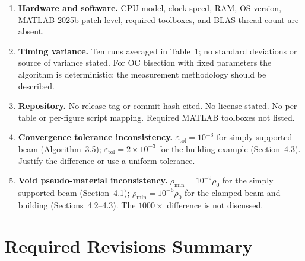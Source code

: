 \documentclass[11pt,a4paper]{article}
\begin{document}
\begin{enumerate}[label=\textbf{R\arabic*.},nosep]

\item \textbf{Hardware and software.} CPU model, clock speed, RAM, OS version,
  MATLAB 2025b patch level, required toolboxes, and BLAS thread count are absent.

\item \textbf{Timing variance.} Ten runs averaged in Table~1; no standard deviations
  or source of variance stated. For OC bisection with fixed parameters the algorithm
  is deterministic; the measurement methodology should be described.

\item \textbf{Repository.} No release tag or commit hash cited. No license stated.
  No per-table or per-figure script mapping. Required MATLAB toolboxes not listed.

\item \textbf{Convergence tolerance inconsistency.} $\varepsilon_\mathrm{tol}=10^{-3}$
  for simply supported beam (Algorithm~3.5); $\varepsilon_\mathrm{tol}=2\times10^{-3}$
  for the building example (Section~4.3). Justify the difference or use a uniform
  tolerance.

\item \textbf{Void pseudo-material inconsistency.} $\rho_\mathrm{min}=10^{-9}\rho_0$
  for the simply supported beam (Section~4.1); $\rho_\mathrm{min}=10^{-6}\rho_0$ for
  the clamped beam and building (Sections~4.2--4.3). The $1000\times$ difference is
  not discussed.

\end{enumerate}


\section{Required Revisions Summary}
\end{document}

